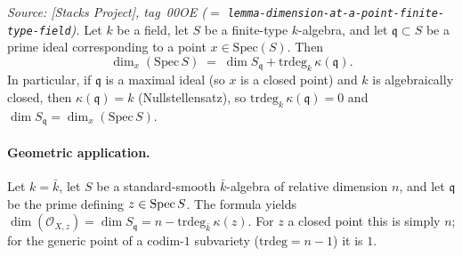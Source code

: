 \begin{lemma}
  \label{lem:smooth_algebra_krull_dim_formula}
  \textit{Source: [Stacks Project], tag~00OE (\(=\) \texttt{lemma-dimension-at-a-point-finite-type-field}).}
  Let \(k\) be a field, let \(S\) be a finite-type \(k\)-algebra, and let
  \(\mathfrak q \subset S\) be a prime ideal corresponding to a point
  \(x \in \mathrm{Spec}(S)\). Then
  \[
    \dim_x(\mathrm{Spec}\,S)
    \;=\; \dim S_{\mathfrak q} + \mathrm{trdeg}_k\,\kappa(\mathfrak q).
  \]
  In particular, if \(\mathfrak q\) is a maximal ideal (so \(x\) is a
  closed point) and \(k\) is algebraically closed, then
  \(\kappa(\mathfrak q) = k\) (Nullstellensatz), so
  \(\mathrm{trdeg}_k\,\kappa(\mathfrak q) = 0\) and
  \(\dim S_{\mathfrak q} = \dim_x(\mathrm{Spec}\,S)\).

  \paragraph{Geometric application.} Let \(k = \bar k\), let
  \(S\) be a standard-smooth \(\bar k\)-algebra of relative dimension
  \(n\), and let \(\mathfrak q\) be the prime defining \(z \in \operatorname{Spec} S\).  The
  formula yields \(\dim(\mathcal O_{X, z}) = \dim S_{\mathfrak q} = n -
  \mathrm{trdeg}_{\bar k}\,\kappa(z)\). For \(z\) a closed point this is
  simply \(n\); for the generic point of a codim-\(1\) subvariety
  (\(\mathrm{trdeg} = n - 1\)) it is \(1\).
\end{lemma}


